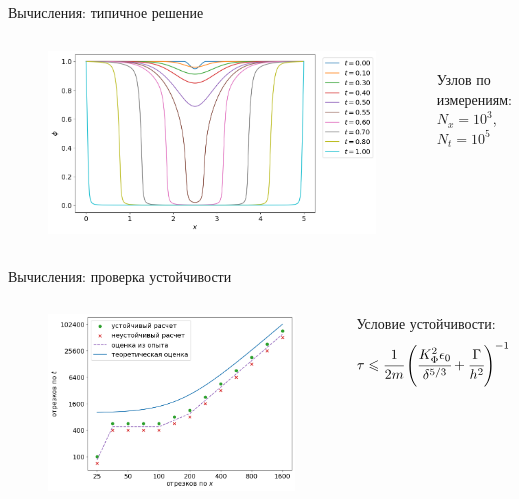 \begin{frame}{Вычисления: типичное решение}
\vspace{-0.4cm}
\begin{columns}
\begin{figure}
	\includegraphics[width=\textwidth]{figures/typical_solution.png}
\end{figure}
\hfill \\
\vspace{3.5cm}
\hspace{-2.5cm}
Узлов по измерениям: \\
\hspace{-2.5cm}
$N_x = 10^3$, $N_t = 10^5$
\end{columns}
\end{frame}


\begin{frame}{Вычисления: проверка устойчивости}
\vspace{-0.4cm}
\begin{columns}
\begin{figure}
	\includegraphics[width=\textwidth]{figures/stability_bounds.png}
\end{figure}
Условие устойчивости:
$$\tau \leqslant \cfrac{1}{2m} \left( \cfrac{K_\Phi^2 \epsilon_0}{\delta^{5/3}} +
\cfrac{\Gamma}{h^2} \right)^{-1}$$
\end{columns}
\end{frame}


